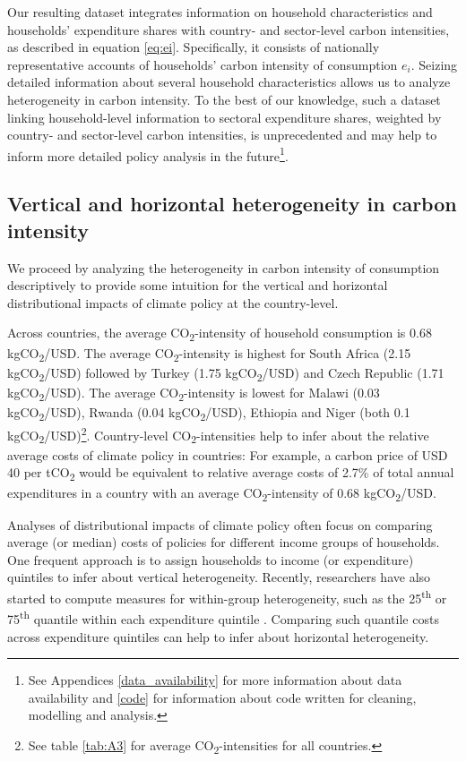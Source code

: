 \documentclass[12pt, a4paper]{article}
\begin{document}
Our resulting dataset integrates information on household characteristics and households' expenditure shares with country- and sector-level carbon intensities, as described in equation \ref{eq:ei}. Specifically, it consists of nationally representative accounts of households' carbon intensity of consumption $e_{i}$. Seizing detailed information about several household characteristics allows us to analyze heterogeneity in carbon intensity. To the best of our knowledge, such a dataset linking household-level information to sectoral expenditure shares, weighted by country- and sector-level carbon intensities, is unprecedented and may help to inform more detailed policy analysis in the future\footnote{See Appendices \ref{data_availability} for more information about data availability and \ref{code} for information about code written for cleaning, modelling and analysis.}.

\subsection{Vertical and horizontal heterogeneity in carbon intensity} \label{sec:descriptive}

We proceed by analyzing the heterogeneity in carbon intensity of consumption descriptively to provide some intuition for the vertical and horizontal distributional impacts of climate policy at the country-level.

Across countries, the average CO\textsubscript{2}-intensity of household consumption is 0.68 kgCO\textsubscript{2}/USD. The average CO\textsubscript{2}-intensity is highest for South Africa (2.15 kgCO\textsubscript{2}/USD) followed by Turkey (1.75 kgCO\textsubscript{2}/USD) and Czech Republic (1.71 kgCO\textsubscript{2}/USD). The average CO\textsubscript{2}-intensity is lowest for Malawi (0.03 kgCO\textsubscript{2}/USD), Rwanda (0.04 kgCO\textsubscript{2}/USD), Ethiopia and Niger (both 0.1 kgCO\textsubscript{2}/USD)\footnote{See table \ref{tab:A3} for average CO\textsubscript{2}-intensities for all countries.}. Country-level CO\textsubscript{2}-intensities help to infer about the relative average costs of climate policy in countries: For example, a carbon price of USD 40 per tCO\textsubscript{2} \autocite{Stiglitz.2017} would be equivalent to relative average costs of 2.7\% of total annual expenditures in a country with an average CO\textsubscript{2}-intensity of 0.68 kgCO\textsubscript{2}/USD.

Analyses of distributional impacts of climate policy often focus on comparing average (or median) costs of policies for different income groups of households. One frequent approach is to assign households to income (or expenditure) quintiles to infer about vertical heterogeneity. Recently, researchers have also started to compute measures for within-group heterogeneity, such as the 25\textsuperscript{th} or 75\textsuperscript{th} quantile within each expenditure quintile \autocite{Cronin.2019, Missbach.2024}. Comparing such quantile costs across expenditure quintiles can help to infer about horizontal heterogeneity.
\end{document}
